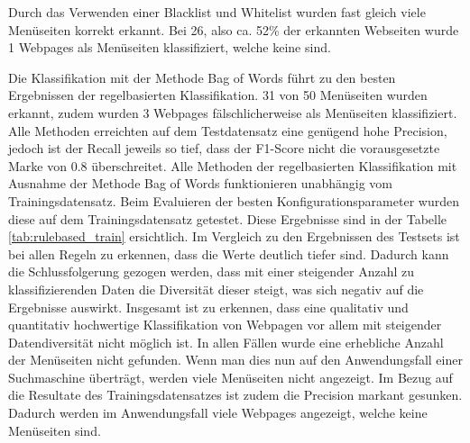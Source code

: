 Durch das Verwenden einer Blacklist und Whitelist wurden fast gleich viele Menüseiten korrekt erkannt. Bei 26, also ca. 52\% der erkannten Webseiten wurde 1 Webpages als Menüseiten klassifiziert, welche keine sind.

Die Klassifikation mit der Methode \glqq Bag of Words\grqq{} führt zu den besten Ergebnissen der regelbasierten Klassifikation.
31 von 50 Menüseiten wurden erkannt, zudem wurden 3 Webpages fälschlicherweise als Menüseiten klassifiziert.\\

Alle Methoden erreichten auf dem Testdatensatz eine genügend hohe Precision, jedoch ist der Recall jeweils so tief, dass der F1-Score nicht die vorausgesetzte Marke von 0.8 überschreitet.
Alle Methoden der regelbasierten Klassifikation mit Ausnahme der Methode \glqq Bag of Words\grqq{} funktionieren unabhängig vom Trainingsdatensatz.
Beim Evaluieren der besten Konfigurationsparameter wurden diese auf dem Trainingsdatensatz getestet.
Diese Ergebnisse sind in der Tabelle \cref{tab:rulebased_train} ersichtlich.
Im Vergleich zu den Ergebnissen des Testsets ist bei allen Regeln zu erkennen, dass die Werte deutlich tiefer sind.
Dadurch kann die Schlussfolgerung gezogen werden, dass mit einer steigender Anzahl zu klassifizierenden Daten die Diversität dieser steigt, was sich negativ auf die Ergebnisse auswirkt.
Insgesamt ist zu erkennen, dass eine qualitativ und quantitativ hochwertige Klassifikation von Webpagen vor allem mit steigender Datendiversität nicht möglich ist.
In allen Fällen wurde eine erhebliche Anzahl der Menüseiten nicht gefunden.
Wenn man dies nun auf den Anwendungsfall einer Suchmaschine überträgt, werden viele Menüseiten nicht angezeigt.
Im Bezug auf die Resultate des Trainingsdatensatzes ist zudem die Precision markant gesunken.
Dadurch werden im Anwendungsfall viele Webpages angezeigt, welche keine Menüseiten sind.
